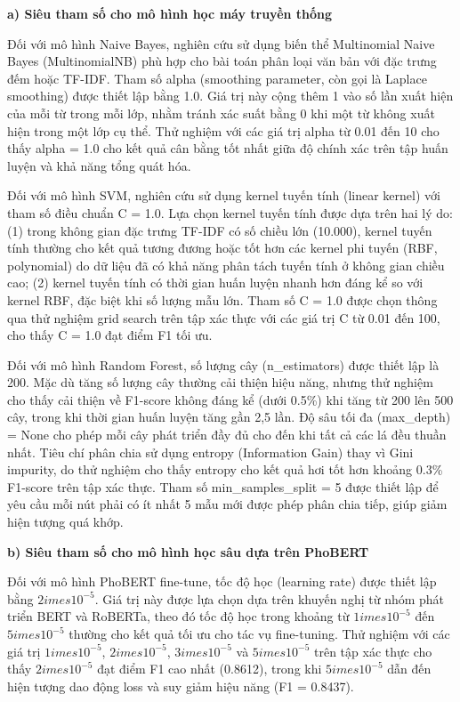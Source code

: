 \documentclass[14pt, a4paper]{report}
\begin{document}
\textbf{a) Siêu tham số cho mô hình học máy truyền thống}


Đối với mô hình Naive Bayes, nghiên cứu sử dụng biến thể Multinomial Naive Bayes (MultinomialNB) phù hợp cho bài toán phân loại văn bản với đặc trưng đếm hoặc TF-IDF. Tham số alpha (smoothing parameter, còn gọi là Laplace smoothing) được thiết lập bằng 1.0. Giá trị này cộng thêm 1 vào số lần xuất hiện của mỗi từ trong mỗi lớp, nhằm tránh xác suất bằng 0 khi một từ không xuất hiện trong một lớp cụ thể. Thử nghiệm với các giá trị alpha từ 0.01 đến 10 cho thấy alpha = 1.0 cho kết quả cân bằng tốt nhất giữa độ chính xác trên tập huấn luyện và khả năng tổng quát hóa.


Đối với mô hình SVM, nghiên cứu sử dụng kernel tuyến tính (linear kernel) với tham số điều chuẩn C = 1.0. Lựa chọn kernel tuyến tính được dựa trên hai lý do: (1) trong không gian đặc trưng TF-IDF có số chiều lớn (10.000), kernel tuyến tính thường cho kết quả tương đương hoặc tốt hơn các kernel phi tuyến (RBF, polynomial) do dữ liệu đã có khả năng phân tách tuyến tính ở không gian chiều cao; (2) kernel tuyến tính có thời gian huấn luyện nhanh hơn đáng kể so với kernel RBF, đặc biệt khi số lượng mẫu lớn. Tham số C = 1.0 được chọn thông qua thử nghiệm grid search trên tập xác thực với các giá trị C từ 0.01 đến 100, cho thấy C = 1.0 đạt điểm F1 tối ưu.


Đối với mô hình Random Forest, số lượng cây (n\_estimators) được thiết lập là 200. Mặc dù tăng số lượng cây thường cải thiện hiệu năng, nhưng thử nghiệm cho thấy cải thiện về F1-score không đáng kể (dưới 0.5\%) khi tăng từ 200 lên 500 cây, trong khi thời gian huấn luyện tăng gần 2,5 lần. Độ sâu tối đa (max\_depth) = None cho phép mỗi cây phát triển đầy đủ cho đến khi tất cả các lá đều thuần nhất. Tiêu chí phân chia sử dụng entropy (Information Gain) thay vì Gini impurity, do thử nghiệm cho thấy entropy cho kết quả hơi tốt hơn khoảng 0.3\% F1-score trên tập xác thực. Tham số min\_samples\_split = 5 được thiết lập để yêu cầu mỗi nút phải có ít nhất 5 mẫu mới được phép phân chia tiếp, giúp giảm hiện tượng quá khớp.


\textbf{b) Siêu tham số cho mô hình học sâu dựa trên PhoBERT}


Đối với mô hình PhoBERT fine-tune, tốc độ học (learning rate) được thiết lập bằng $2 	imes 10^{-5}$. Giá trị này được lựa chọn dựa trên khuyến nghị từ nhóm phát triển BERT và RoBERTa, theo đó tốc độ học trong khoảng từ $1 	imes 10^{-5}$ đến $5 	imes 10^{-5}$ thường cho kết quả tối ưu cho tác vụ fine-tuning. Thử nghiệm với các giá trị $1 	imes 10^{-5}$, $2 	imes 10^{-5}$, $3 	imes 10^{-5}$ và $5 	imes 10^{-5}$ trên tập xác thực cho thấy $2 	imes 10^{-5}$ đạt điểm F1 cao nhất (0.8612), trong khi $5 	imes 10^{-5}$ dẫn đến hiện tượng dao động loss và suy giảm hiệu năng (F1 = 0.8437).
\end{document}
